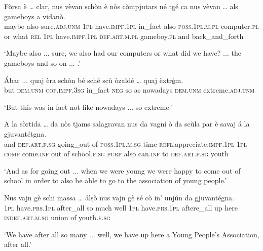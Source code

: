 \begin{linenumbers}
	\gll Fòrsa è … clar, nus vèvan schòn è nòs còmpjutars né tgé ca nus vèvan … als gameboys a vidanò.    \\
	maybe also {} sure.\textsc{adj.unm} \textsc{1pl} have.\textsc{impf.1pl} in\_fact also \textsc{poss.1pl.m.pl} computer.\textsc{pl} or what \textsc{rel} \textsc{1pl} have.\textsc{impf.1pl} {} \textsc{def.art.m.pl} gameboy.\textsc{pl} and back\_and\_forth \\
\end{linenumbers}
\medskip
\glt `Maybe also ... sure, we also had our computers or what did we have? ... the gameboys and so on ... .'
\medskip

\begin{linenumbers}
	\gll  Ábar ... quaj èra schòn bé sché scù òzaldé … quaj èxtr\underline{è}m.   \\
	but {} \textsc{dem.unm} \textsc{cop.impf.3sg} in\_fact \textsc{neg} so as nowadays {} \textsc{dem.unm} extreme.\textsc{adj.unm}\\
\end{linenumbers}
\medskip
\glt `But this was in fact not like nowadays ... so extreme.'
\medskip

\begin{linenumbers}
	\gll A la sòrtida … da nòs tjams salagravan nus da vagní ò da scùla par è savaj á la gjuvantétgna.\\
	and \textsc{def.art.f.sg} going\_out {} of \textsc{ poss.1pl.m.sg} time \textsc{refl}.appreciate.\textsc{impf.1pl} \textsc{1pl} \textsc{comp} come.\textsc{inf} out of school.\textsc{f.sg} \textsc{purp} also can.\textsc{inf} to \textsc{def.art.f.sg} youth\\
\end{linenumbers}
\medskip
\glt `And as for going out ... when we were young we were happy to come out of school in order to also be able to go to the association of young people.'
\medskip

\begin{linenumbers}
	\gll Nus vajn gè schi massa … álṣò nus vajn gè sé cò in’ unjún da gjuvantégna. \\
\textsc{1pl} have.\textsc{prs.1pl} after\_all so much {} well \textsc{1pl} have.\textsc{prs.1pl} aftere\_all up here \textsc{indef.art.m.sg} union of youth.\textsc{f.sg}	\\
\end{linenumbers}
\medskip
\glt `We have after all so many ... well, we have up here a Young People's Association, after all.'
\medskip



